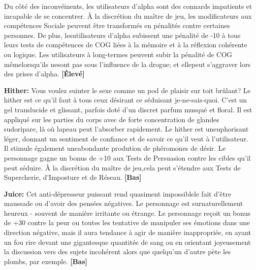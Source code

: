 Du côté des inconvéinents, les utilisateurs d'alpha sont des connards impatients et incapable de se concentrer. À la discrétion du maître de jeu, les modificateurs aux compétences Sociale peuvent être transformés en pénalités contre certaines personnes. De plus, lesutilisateurs d'alpha subissent une pénalité de -10 à tous leurs tests de compétences de COG liées à la mémoire et à la réflexion cohérente ou logique. Les utilisateurs à long-termes peuvent subir la pénalité de COG mêmelorsqu'ils nesont pas sous l'influence de la drogue; et ellepeut s'aggraver lors des prises d'alpha. \textbf{[Élevé]} 

\textbf{Hither:} Vous voulez suinter le sexe comme un pod de plaisir sur toit brûlant? Le hither est ce qu'il faut à tous ceux désirant ce séduisant je-ne-sais-quoi. C'est un gel translucide et glissant, parfois doté d'un discret parfum musqué et floral. Il est appliqué sur les parties du corps avec de forte concentration de glandes sudoripare, là où lapeau peut l'absorber rapidement. Le hither est uneuphorisant léger, donnant un sentiment de confiance et de savoir ce qu'il veut à l'utilisateur. Il stimule également uneabondante prodution de phéromones de désir. Le personnage gagne un bonus de +10 aux Tests de Persuasion contre les cibles qu'il peut séduire. À la discrétion du maître de jeu,cela peut s'étendre aux Tests de Supercherie, d'Imposture et de Réseau. \textbf{[Bas]} 

\textbf{Juice:} Cet anti-dépresseur puissant rend quasiment impossiblele fait d'être maussade ou d'avoir des pensées négatives. Le personnage est surnaturellement heureux - souvent de manière irritante ou étrange. Le personnage reçoit un bonus de +30 contre la peur ou toutes les tentative de manipuler ses émotions dans une direction négative, mais il aura tendance à agir de manière inappropriée, en ayant un fou rire devant une gigantesque quantitée de sang ou en orientant joyeusement  la discussion vers des sujets incohérent alors que quelqu'un d'autre pète les plombs, par exemple. \textbf{[Bas]} 

